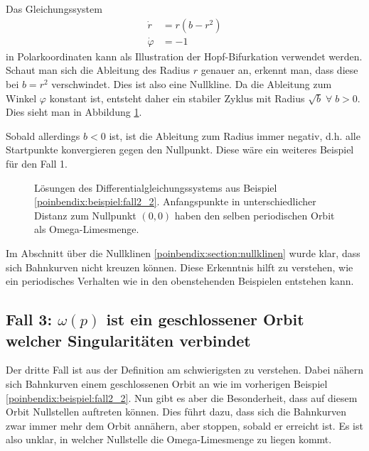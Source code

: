 \begin{beispiel} \label{poinbendix:beispiel:fall2_2}
Das Gleichungssystem
\begin{align*}
    \dot{r}       &= r(b-r^2) \\
    \dot{\varphi} &= -1
\end{align*}
in Polarkoordinaten kann als Illustration der Hopf-Bifurkation verwendet werden.
%
Schaut man sich die Ableitung des Radius $r$ genauer an, erkennt man, dass diese bei $b = r^2$ verschwindet.
Dies ist also eine Nullkline.
Da die Ableitung zum Winkel $\varphi$ konstant ist, entsteht daher ein stabiler Zyklus mit Radius $\sqrt{b} \; \forall \; b > 0$.
Dies sieht man in Abbildung \ref{poinbendix:fig:fall_2_2}.

Sobald allerdings $b < 0$ ist, ist die Ableitung zum Radius immer negativ, d.h. alle Startpunkte konvergieren gegen den Nullpunkt.
Diese wäre ein weiteres Beispiel für den Fall 1.
\end{beispiel}

\begin{figure}
\centering
    
    \caption{Lösungen des Differentialgleichungssystems aus Beispiel \ref{poinbendix:beispiel:fall2_2}.
    Anfangspunkte in unterschiedlicher Distanz zum Nullpunkt $(0,0)$ haben den selben periodischen Orbit als Omega-Limesmenge.}
\label{poinbendix:fig:fall_2_2}
\end{figure}

Im Abschnitt über die Nullklinen \ref{poinbendix:section:nullklinen} wurde klar, dass sich Bahnkurven nicht kreuzen können.
Diese Erkenntnis hilft zu verstehen, wie ein periodisches Verhalten wie in den obenstehenden Beispielen entstehen kann.

\subsection{Fall 3: $\omega(p)$ ist ein geschlossener Orbit welcher Singularitäten verbindet} \label{poinbendix:subsection:fall3}

Der dritte Fall ist aus der Definition am schwierigsten zu verstehen.
Dabei nähern sich Bahnkurven einem geschlossenen Orbit an wie im vorherigen Beispiel \ref{poinbendix:beispiel:fall2_2}.
Nun gibt es aber die Besonderheit, dass auf diesem Orbit Nullstellen auftreten können.
Dies führt dazu, dass sich die Bahnkurven zwar immer mehr dem Orbit annähern, aber stoppen, sobald er erreicht ist.
Es ist also unklar, in welcher Nullstelle die Omega-Limesmenge zu liegen kommt.

